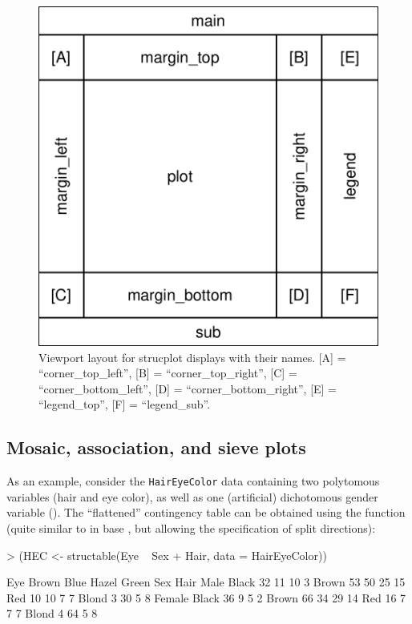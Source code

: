 \documentclass{Z}
\newcommand{\data}[1]{\texttt{#1}}
\newcommand{\codefun}[1]{\code{#1()}}
\begin{document}
\begin{figure}[h]
\begin{center}
\includegraphics{strucplot-vcdlayout}
\caption{Viewport layout for strucplot displays with their names. [A] =
  ``corner\_top\_left'', [B] = ``corner\_top\_right'', 
  [C] = ``corner\_bottom\_left'', [D] = ``corner\_bottom\_right'', [E]
  = ``legend\_top'', [F] = ``legend\_sub''.}
\label{fig:layout}
\end{center}
\end{figure}

\subsection{Mosaic, association, and sieve plots}

As an example, consider the \data{HairEyeColor} 
data containing two polytomous variables (hair and eye color), 
as well as one (artificial) dichotomous gender variable (). The
``flattened'' contingency table can be obtained using the
\codefun{structable} function (quite similar to \codefun{ftable} in
base , but allowing the specification of split directions):

\begin{Schunk}
\begin{Sinput}
> (HEC <- structable(Eye ~ Sex + Hair, data = HairEyeColor))
\end{Sinput}
\begin{Soutput}
             Eye Brown Blue Hazel Green
Sex    Hair                            
Male   Black        32   11    10     3
       Brown        53   50    25    15
       Red          10   10     7     7
       Blond         3   30     5     8
Female Black        36    9     5     2
       Brown        66   34    29    14
       Red          16    7     7     7
       Blond         4   64     5     8
\end{Soutput}
\end{Schunk}
\end{document}
